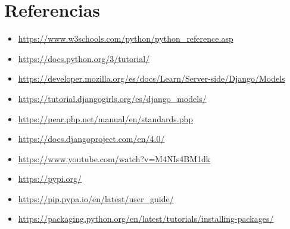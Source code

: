 \documentclass{article}
\begin{document}
\section{Referencias}
\begin{itemize}	
    \item \url{https://www.w3schools.com/python/python_reference.asp}
    \item \url{ https://docs.python.org/3/tutorial/}
    \item \url{https://developer.mozilla.org/es/docs/Learn/Server-side/Django/Models}
    \item \url{https://tutorial.djangogirls.org/es/django_models/}
    \item \url{https://pear.php.net/manual/en/standards.php}
    \item \url{https://docs.djangoproject.com/en/4.0/}
    \item \url{https://www.youtube.com/watch?v=M4NIs4BM1dk}
    \item \url{https://pypi.org/}
    \item \url{https://pip.pypa.io/en/latest/user_guide/}
    \item \url{https://packaging.python.org/en/latest/tutorials/installing-packages/}
\end{itemize}	
	
%
%
%
			
\end{document}
